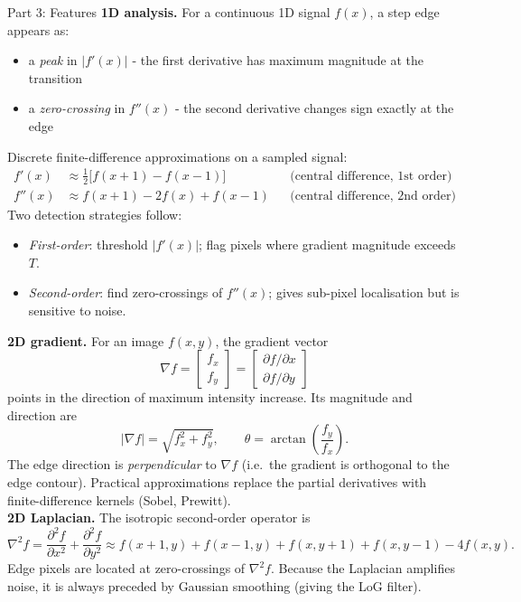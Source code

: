 \documentclass[letterpaper]{article}
\begin{document}
\begin{notes}{Part 3: Features}
\textbf{1D analysis.} For a continuous 1D signal $f(x)$, a step edge appears as:
\begin{itemize}
    \item a \emph{peak} in $|f'(x)|$ - the first derivative has maximum magnitude at the transition
    \item a \emph{zero-crossing} in $f''(x)$ - the second derivative changes sign exactly at the edge
\end{itemize}
Discrete finite-difference approximations on a sampled signal:
\begin{align*}
f'(x) &\approx \tfrac{1}{2}\bigl[f(x+1)-f(x-1)\bigr] && \text{(central difference, 1st order)}\\
f''(x) &\approx f(x+1) - 2f(x) + f(x-1) && \text{(central difference, 2nd order)}
\end{align*}
Two detection strategies follow:
\begin{itemize}
    \item \emph{First-order}: threshold $|f'(x)|$; flag pixels where gradient magnitude exceeds $T$.
    \item \emph{Second-order}: find zero-crossings of $f''(x)$; gives sub-pixel localisation but is sensitive to noise.
\end{itemize}

\textbf{2D gradient.} For an image $f(x,y)$, the gradient vector
$$\nabla f = \begin{bmatrix}f_x \\ f_y\end{bmatrix} = \begin{bmatrix}\partial f/\partial x \\ \partial f/\partial y\end{bmatrix}$$
points in the direction of maximum intensity increase. Its magnitude and direction are
$$|\nabla f| = \sqrt{f_x^2 + f_y^2}, \qquad \theta = \arctan\!\left(\frac{f_y}{f_x}\right).$$
The edge direction is \emph{perpendicular} to $\nabla f$ (i.e.\ the gradient is orthogonal to the edge contour). Practical approximations replace the partial derivatives with finite-difference kernels (Sobel, Prewitt).\\



\textbf{2D Laplacian.} The isotropic second-order operator is
$$\nabla^2 f = \frac{\partial^2 f}{\partial x^2} + \frac{\partial^2 f}{\partial y^2} \approx f(x+1,y)+f(x-1,y)+f(x,y+1)+f(x,y-1)-4f(x,y).$$
Edge pixels are located at zero-crossings of $\nabla^2 f$. Because the Laplacian amplifies noise, it is always preceded by Gaussian smoothing (giving the LoG filter).\\


\end{notes}
\end{document}
